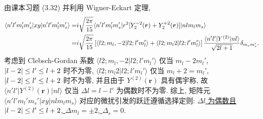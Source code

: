 \documentclass{assignment}
\begin{document}
\begin{sol}
\begin{itemize}
        由课本习题 (3.32) 并利用 Wigner-Eckart 定理,
        \begin{align}
            \notag\langle n'l'm_l'm_s'\rvert xy\lvert n'l'm_l'm_s'\rangle=&i\sqrt{\frac{2\pi}{15}}\langle n'l'm_l'm_s'\rvert r^2[Y_2^{-2}(\bm{r})+Y_2^{+2}(\bm{r})]\lvert nlm_lm_s\rangle\\
            =&i\sqrt{\frac{2\pi}{15}}\left[\langle l2;m_l,-2\vert l2;l'm_l'\rangle+\langle l2;m_l2\vert l2;l'm_l'\rangle\right]\frac{\langle n'l'\rvert Y^{(2)}\lvert nl\rangle}{\sqrt{2l+1}}\delta_{m_sm_s'}.
        \end{align}
        考虑到 Clebsch-Gordan 系数 $\langle l2;m_l,-2\vert l2;l'm_l'\rangle$ 仅当 $m_l-2m_l'$, $\left\lvert l-2\right\rvert\leq l'\leq l+2$ 时不为零, $\langle l2;m_l2\vert l2;l'm_l'\rangle$ 仅当 $m_l+2=m_l'$, $\left\lvert l-2\right\rvert\leq l'\leq l+2$ 时不为零, 并且由于 $Y^{(2)}(\bm{r})$ 具有偶宇称, 故 $\langle n'l'\rvert Y^{(2)}(\bm{r})\lvert nl\rangle$ 仅当 $\Delta l=l-l'$ 为偶数时不为零.
        综上, 矩阵元 $\langle n'l'm_l'm_s'\rvert xy\lvert nlm_lm_s\rangle$ 对应的微扰引发的跃迁遵循选择定则: \uline{$\Delta l$ 为偶数且 $\left\lvert l-2\right\rvert\leq l'\leq l+2$, $\Delta m_l=\pm 2$, $\Delta_s=0$}.
    \end{itemize}
\end{sol}
\end{document}
